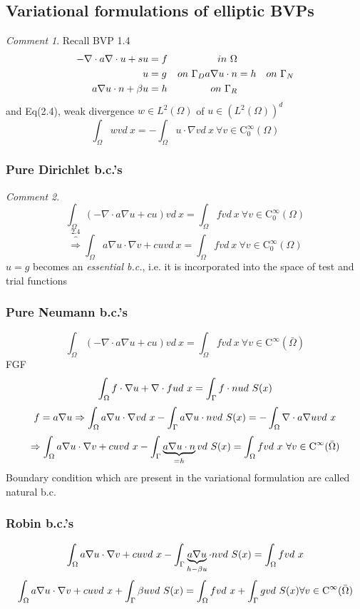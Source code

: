 \documentclass[english]{article}
\theoremstyle{definition}
\theoremstyle{remark}
\newtheorem*{comm}{Comment}
\newcommand{\bb}{\beta}					%
\newcommand{\OO}{\Omega}
\newcommand{\cinf}{\tx{C}^\infty}
\newcommand{\drw}{\Rightarrow}			%
\newcommand{\tri}{\nabla}
\newcommand{\tx}[1]{\text{#1}}
\begin{document}
\subsection{Variational formulations of elliptic BVPs}
\begin{comm}
  Recall BVP 1.4
  \begin{align}
    -\tri \cdot a \tri \cdot u + su &= f& in\ \OO\\
    u&=g &on\ \GG_D
    a \tri u \cdot n &= h& on\ \GG_N\\
    a\tri u \cdot n + \bb u &= h& on\ \GG_R
  \end{align}
  and Eq(2.4), weak divergence $w \in L^2(\OO)$ of $u \in (L^2(\OO))^d$
  $$\int_\OO w v d\ x = - \int_\OO u \cdot \tri v d\ x \ \forall v \in \cinf_0(\OO)$$
\end{comm}
\subsubsection{Pure Dirichlet b.c.'s}
\begin{comm}
  $$\int_\OO (-\tri \cdot a \tri u + cu)v d\ x = \int_\OO fv d\ x \ \forall v\in\cinf_0(\OO)$$
  $$\overbrace{\drw}^{2.4} \int_\OO a \tri u \cdot \tri v + cuv d\ x = \int_\OO fv d\ x \ \forall v\in\cinf_0(\OO)$$
  $u=g$ becomes an \emph{essential b.c.}, i.e. it is incorporated into the space of test and trial functions
\end{comm}
\subsubsection{Pure Neumann b.c.'s}
$$\int_\OO (-\tri \cdot a \tri u + c u) v d\ x = \int_\OO f v d\ x \ \forall v \in \cinf(\bar\OO)$$
FGF
$$\int_\OO f \cdot \tri u + \tri \cdot f u d\ x = \int_\GG f\cdot n u d\ S(x)$$
$$f= a \tri u \drw \int_\OO a\tri u \cdot \tri v d\ x - \int_\GG a \tri u \cdot n v d\ S(x)=-\int_\OO \tri \cdot a \tri u v d\ x$$
$$\drw \int_\OO a \tri u \cdot \tri v + c u v d\ x - \int_\GG \underbrace{a\tri u \cdot n}_{=h} v d\ S(x) = \int_\OO f v d\ x \ \forall v\in\cinf(\bar\OO)$$
Boundary condition which are present in the variational formulation are called natural b.c.
\subsubsection{Robin b.c.'s}
$$\int_{\OO}a \tri u \cdot \tri v + c u v d\ x - \int_\GG \underbrace{a \tri u}_{h-\bb u} \cdot n v d\ S(x) = \int_\OO f v d\ x$$
$$\int_\OO a \tri u \cdot \tri v + c u v d\ x + \int_\GG \bb u v d\ S(x) = \int_\OO f v d\ x + \int_\GG g v d\ S(x) \forall v \in \cinf (\bar\OO)$$
\end{document}
